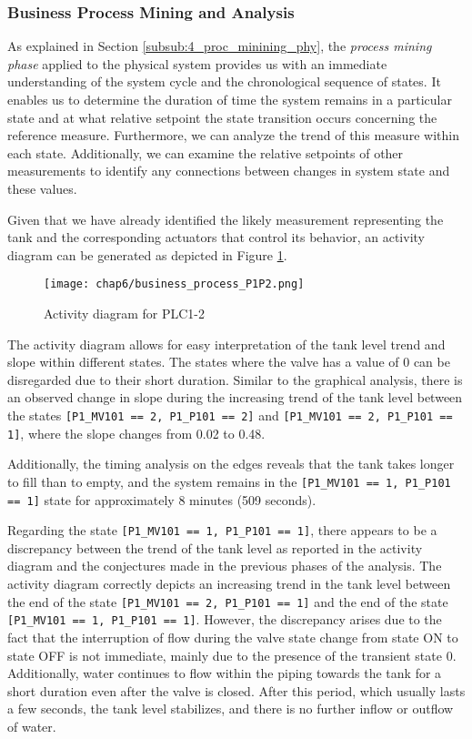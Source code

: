 \subsubsection{Business Process Mining and Analysis}
\label{subsubsec:6_P1P2_bpa}
As explained in Section \ref{subsub:4_proc_minining_phy}, the \textit{process mining phase} applied to the physical system provides us with an immediate understanding of the system cycle and the chronological sequence of states. It enables us to determine the duration of time the system remains in a particular state and at what relative setpoint the state transition occurs concerning the reference measure. Furthermore, we can analyze the trend of this measure within each state. Additionally, we can examine the relative setpoints of other measurements to identify any connections between changes in system state and these values. 

\bigskip
Given that we have already identified the likely measurement representing the tank and the corresponding actuators that control its behavior, an activity diagram can be generated as depicted in Figure \ref{fig:6_P1P2_process_mining}.

\begin{figure}[ht]
	\centering
	\texttt{[image: chap6/business\_process\_P1P2.png]}
	\caption{Activity diagram for PLC1-2}
	\label{fig:6_P1P2_process_mining}
\end{figure}

\bigskip
The activity diagram allows for easy interpretation of the tank level trend and slope within different states. The states where the valve has a value of 0 can be disregarded due to their short duration. Similar to the graphical analysis, there is an observed change in slope during the increasing trend of the tank level between the states \texttt{[P1\_MV101 == 2, P1\_P101 == 2]} and \texttt{[P1\_MV101 == 2, P1\_P101 == 1]}, where the slope changes from 0.02 to 0.48.

Additionally, the timing analysis on the edges reveals that the tank takes longer to fill than to empty, and the system remains in the \texttt{[P1\_MV101 == 1, P1\_P101 == 1]} state for approximately 8 minutes (509 seconds).

\bigskip
Regarding the state \texttt{[P1\_MV101 == 1, P1\_P101 == 1]}, there appears to be a discrepancy between the trend of the tank level as reported in the activity diagram and the conjectures made in the previous phases of the analysis. The activity diagram correctly depicts an increasing trend in the tank level between the end of the state \texttt{[P1\_MV101 == 2, P1\_P101 == 1]} and the end of the state \texttt{[P1\_MV101 == 1, P1\_P101 == 1]}. However, the discrepancy arises due to the fact that the interruption of flow during the valve state change from state ON to state OFF is not immediate, mainly due to the presence of the transient state 0. Additionally, water continues to flow within the piping towards the tank for a short duration even after the valve is closed. After this period, which usually lasts a few seconds, the tank level stabilizes, and there is no further inflow or outflow of water. 

